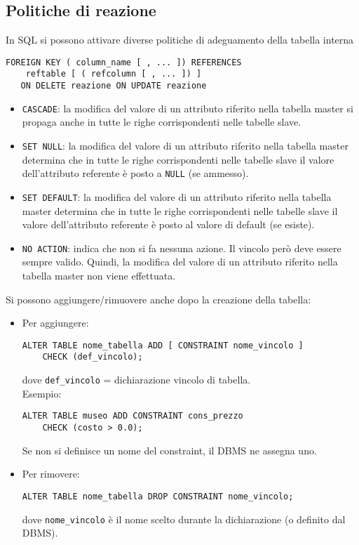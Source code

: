 \documentclass[a4paper, 10pt, titlepage]{article}
\begin{document}
	\subsection{Politiche di reazione}
		In SQL si possono attivare diverse politiche di adeguamento della tabella
		interna
		\begin{lstlisting}
FOREIGN KEY ( column_name [ , ... ]) REFERENCES
	reftable [ ( refcolumn [ , ... ]) ]
   ON DELETE reazione ON UPDATE reazione
		\end{lstlisting}
		\begin{itemize}
			\item \lstinline|CASCADE|: la modifica del valore di un attributo riferito nella tabella master
			si propaga anche in tutte le righe corrispondenti nelle tabelle slave.

			\item \lstinline|SET NULL|: la modifica del valore di un attributo riferito nella tabella
			master determina che in tutte le righe corrispondenti nelle tabelle slave
			il valore dell’attributo referente è posto a \lstinline|NULL| (se ammesso).

			\item \lstinline|SET DEFAULT|: la modifica del valore di un attributo riferito nella tabella
			master determina che in tutte le righe corrispondenti nelle tabelle slave
			il valore dell’attributo referente è posto al valore di default (se esiste).

			\item \lstinline|NO ACTION|: indica che non si fa nessuna azione. Il vincolo però deve
			essere sempre valido. Quindi, la modifica del valore di un attributo
			riferito nella tabella master non viene effettuata.
		\end{itemize}
		Si possono aggiungere/rimuovere anche dopo la creazione della tabella:
		\begin{itemize}
\item Per aggiungere:
\begin{lstlisting}
ALTER TABLE nome_tabella ADD [ CONSTRAINT nome_vincolo ]
	CHECK (def_vincolo);
\end{lstlisting}
dove \lstinline|def_vincolo| = dichiarazione vincolo di tabella. \medskip \\
Esempio: 
\begin{lstlisting}
ALTER TABLE museo ADD CONSTRAINT cons_prezzo 
	CHECK (costo > 0.0);
\end{lstlisting}
Se non si definisce un nome del constraint, il DBMS ne assegna uno.
\item Per rimovere:
\begin{lstlisting}
ALTER TABLE nome_tabella DROP CONSTRAINT nome_vincolo;
\end{lstlisting}
dove \lstinline|nome_vincolo| è il nome scelto durante la dichiarazione (o definito dal DBMS).
\end{itemize}
\newpage
\end{document}

